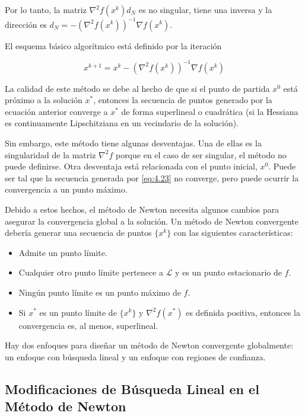 Por lo tanto, la matriz $\nabla^2f(x^k)d_N$ es no singular, tiene una inversa y la dirección es $d_N = -(\nabla^2 f(x^k))^{-1}\nabla f(x^k)$.

El esquema básico algorítmico está definido por la iteración

\begin{equation}
x^{k+1} = x^k - (\nabla^2f(x^k))^{-1}\nabla f(x^k)
\label{eq:4.23}
\end{equation}

La calidad de este método se debe al hecho de que si el punto de partida $x^0$ está próximo a la solución $x^*$, entonces la secuencia de puntos generado por la ecuación anterior converge a $x^*$ de forma superlineal o cuadrática (si la Hessiana es continuamente Lipschitziana en un vecindario de la solución).

Sin embargo, este método tiene algunas desventajas. 
Una de ellas es la singularidad de la matriz $\nabla^2f$ porque en el caso de ser singular, el método no puede definirse. 
Otra desventaja está relacionada con el punto inicial, $x^0$. Puede ser tal que la secuencia generada por \ref{eq:4.23} no converge, pero puede ocurrir la convergencia a un punto máximo.

Debido a estos hechos, el método de Newton necesita algunos cambios para asegurar la convergencia global a la solución. 
Un método de Newton convergente debería generar una secuencia de puntos $\{x^k\}$ con las siguientes características:

\begin{itemize}
\item Admite un punto límite.
\item Cualquier otro punto límite pertenece a $\mathcal{L}$ y es un punto estacionario de $f$.
\item Ningún punto límite es un punto máximo de $f$.
\item Si $x^*$ es un punto límite de $\{x^k\}$ y $\nabla^2 f(x^*)$ es definida positiva, entonces la convergencia es, al menos, superlineal.
\end{itemize}

Hay dos enfoques para diseñar un método de Newton convergente globalmente: un enfoque con búsqueda lineal y un enfoque con regiones de confianza.

\subsection{Modificaciones de Búsqueda Lineal en el Método de Newton}

